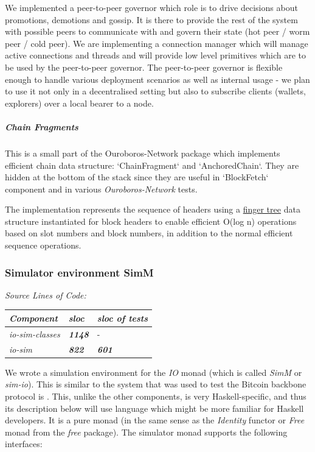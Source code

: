 \documentclass[11pt,a4paper]{article}
\begin{document}
We implemented a peer-to-peer governor which role is to drive decisions
about promotions, demotions and gossip. It is there to provide the rest
of the system with possible peers to communicate with and govern their
state (hot peer / worm peer / cold peer). We are implementing a
connection manager which will manage active connections and threads and
will provide low level primitives which are to be used by the
peer-to-peer governor. The peer-to-peer governor is flexible enough to
handle various deployment scenarios as well as internal usage - we plan
to use it not only in a decentralised setting but also to subscribe
clients (wallets, explorers) over a local bearer to a node.

\subparagraph{Chain Fragments}
\label{chain-fragments}

This is a small part of the Ouroboros-Network package which implements
efficient chain data structure: `ChainFragment` and `AnchoredChain`.
They are hidden at the bottom of the stack since they are useful in
`BlockFetch` component and in various \emph{Ouroboros-Network} tests.

The implementation represents the sequence of headers using a
\href{http://www.staff.city.ac.uk/~ross/papers/FingerTree.html}{finger
tree} data structure instantiated for block headers to enable efficient
O(log n) operations based on slot numbers and block numbers, in addition
to the normal efficient sequence operations.

\subsubsection{Simulator environment SimM}
\label{simulator-environment-simm}

\emph{Source Lines of Code:\\
}

\begin{longtable}[]{@{}lll@{}}
\toprule
\emph{Component} & \emph{sloc} & \emph{sloc of tests}\tabularnewline
\midrule
\endhead
\emph{io-sim-classes} & \emph{\textbf{1148}} & -\tabularnewline
\emph{io-sim} & \emph{\textbf{822}} & \emph{\textbf{601}}\tabularnewline
\bottomrule
\end{longtable}

We wrote a simulation environment for the \emph{IO} monad (which is
called \emph{SimM} or \emph{sim-io}). This is similar to the system that
was used to test the Bitcoin backbone protocol is \cite{MJ15}. This,
unlike the other components, is very Haskell-specific, and thus its
description below will use language which might be more familiar for
Haskell developers. It is a pure monad (in the same sense as the
\emph{Identity} functor or \emph{Free} monad from the \emph{free}
package). The simulator monad supports the following interfaces:
\end{document}
